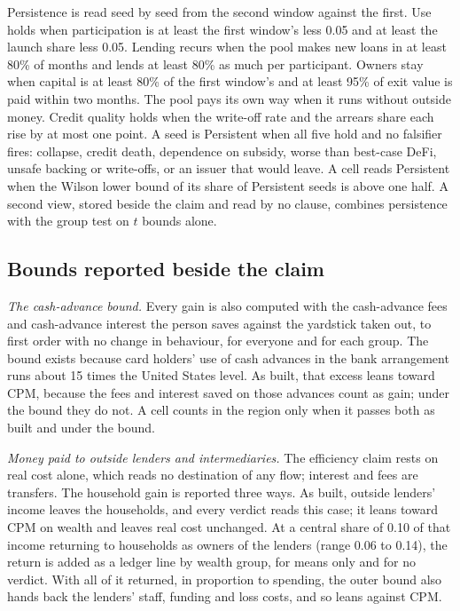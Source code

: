 Persistence is read seed by seed from the second window against the first. Use holds when participation is at
least the first window's less 0.05 and at least the launch share less 0.05. Lending recurs when the pool makes new
loans in at least 80\% of months and lends at least 80\% as much per participant. Owners stay when capital is at
least 80\% of the first window's and at least 95\% of exit value is paid within two months. The pool pays its own
way when it runs without outside money. Credit quality holds when the write-off rate and the arrears share each
rise by at most one point. A seed is Persistent when all five hold and no falsifier fires: collapse, credit death,
dependence on subsidy, worse than best-case DeFi, unsafe backing or write-offs, or an issuer that would leave. A cell
reads Persistent when the Wilson lower bound of its share of Persistent seeds is above one half. A second view,
stored beside the claim and read by no clause, combines persistence with the group test on $t$ bounds alone.

\subsection{Bounds reported beside the claim}

\emph{The cash-advance bound.} Every gain is also computed with the cash-advance fees and cash-advance interest the
person saves against the yardstick taken out, to first order with no change in behaviour, for everyone and for each
group. The bound exists because card holders' use of cash advances in the bank arrangement runs about 15 times the
United States level. As built, that excess leans toward CPM, because the fees and interest saved on those advances
count as gain; under the bound they do not. A cell counts in the region only when it passes both as built and
under the bound.

\emph{Money paid to outside lenders and intermediaries.} The efficiency claim rests on real cost alone, which reads
no destination of any flow; interest and fees are transfers. The household gain is reported three ways. As built,
outside lenders' income leaves the households, and every verdict reads this case; it leans toward CPM on wealth and
leaves real cost unchanged. At a central share of 0.10 of that income returning to households as owners of the
lenders (range 0.06 to 0.14), the return is added as a ledger line by wealth group, for means only and for no
verdict. With all of it returned, in proportion to spending, the outer bound also hands back the lenders' staff,
funding and loss costs, and so leans against CPM.

